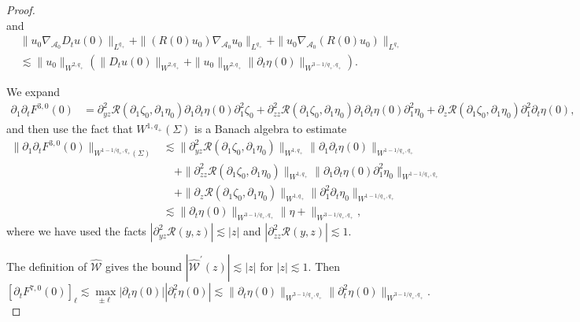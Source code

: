 \documentclass[letterpaper,reqno,10pt,twoside]{amsart}
\theoremstyle{definition}
\theoremstyle{remark}
\def\p{\partial}
\begin{document}
\begin{appendix}
\begin{proof}
\begin{equation}
				\end{equation}
				and
				\begin{equation}\label{est:initial_dtf115}
					\begin{aligned}
						&\|u_0\nabla_{\mathcal{A}_0}D_tu(0)\|_{L^{q_+}}+\|(R(0)u_0)\nabla_{\mathcal{A}_0}u_0\|_{L^{q_+}}+\|u_0\nabla_{\mathcal{A}_0}(R(0)u_0)\|_{L^{q_+}}\\
						&\lesssim \|u_0\|_{W^{2,q_+}}(\|D_tu(0)\|_{W^{2,q_+}}+\|u_0\|_{W^{2,q_+}}\|\p_t\eta(0)\|_{W^{3-1/q_+,q_+}}).
					\end{aligned}
				\end{equation}
				
				We expand
				\[
				\begin{aligned}
					\p_1\p_tF^{3,0}(0)&=\p_{yz}^2\mathcal{R}(\p_1\zeta_0, \p_1\eta_0)\p_1\p_t\eta(0)\p_1^2\zeta_0+\p_{zz}^2\mathcal{R}(\p_1\zeta_0, \p_1\eta_0)\p_1\p_t\eta(0)\p_1^2\eta_0+\p_z\mathcal{R}(\p_1\zeta_0, \p_1\eta_0)\p_1^2\p_t\eta(0),
				\end{aligned}
				\]
				and then use the fact that $W^{1,q_+}(\Sigma)$ is a Banach algebra to estimate
				\begin{equation}\label{est:initial_dtf311}
					\begin{aligned}
						\|\p_1\p_tF^{3,0}(0)\|_{W^{1-1/q_+,q_+}(\Sigma)}&\lesssim \|\p_{yz}^2\mathcal{R}(\p_1\zeta_0, \p_1\eta_0)\|_{W^{1,q_+}}\|\p_1\p_t\eta(0)\|_{W^{1-1/q_+,q_+}}\\
						&\quad+\|\p_{zz}^2\mathcal{R}(\p_1\zeta_0, \p_1\eta_0)\|_{W^{1,q_+}}\|\p_1\p_t\eta(0)\p_1^2\eta_0\|_{W^{1-1/q_+,q_+}}\\
						&\quad+\|\p_z\mathcal{R}(\p_1\zeta_0, \p_1\eta_0)\|_{W^{1,q_+}}\|\p_1^2\p_t\eta_0\|_{W^{1-1/q_+,q_+}}\\
						&\lesssim \|\p_t\eta(0)\|_{W^{3-1/q_+,q_+}}\|\eta+\|_{W^{3-1/q_+,q_+}},
					\end{aligned}
				\end{equation}
				where we have used the facts $|\p_{yz}^2\mathcal{R}(y,z)|\lesssim|z|$ and $|\p_{zz}^2\mathcal{R}(y,z)|\lesssim1$.
				
				The definition of $\hat{\mathscr{W}}$ gives the bound $|\hat{\mathscr{W}}^\prime(z)|\lesssim|z|$ for $|z|\lesssim1$. Then
				\begin{equation}\label{est:initial_dtf711}
					[\p_tF^{7,0}(0)]_\ell\lesssim \max_{\pm\ell}|\p_t\eta(0)||\p_t^2\eta(0)|\lesssim \|\p_t\eta(0)\|_{W^{3-1/q_+,q_+}}\|\p_t^2\eta(0)\|_{W^{3-1/q_+,q_+}}.
				\end{equation}
				

\end{proof}
\end{appendix}
\end{document}
